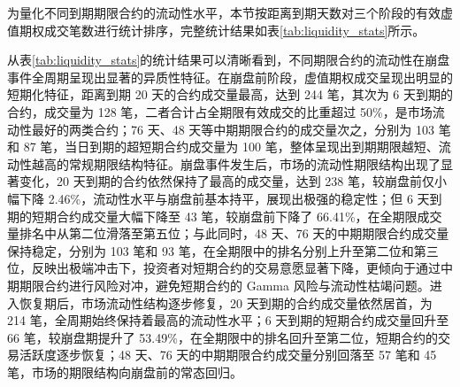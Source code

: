 为量化不同到期期限合约的流动性水平，本节按距离到期天数对三个阶段的有效虚值期权成交笔数进行统计排序，完整统计结果如表\ref{tab:liquidity_stats}所示。

\begin{table}[htbp]
  \centering
  \caption{崩盘事件全周期不同到期期限 OTM 期权成交笔数统计}\label{tab:liquidity_stats}
\end{table}
从表\ref{tab:liquidity_stats}的统计结果可以清晰看到，不同期限合约的流动性在崩盘事件全周期呈现出显著的异质性特征。在崩盘前阶段，虚值期权成交呈现出明显的短期化特征，距离到期 20 天的合约成交量最高，达到 244 笔，其次为 6 天到期的合约，成交量为 128 笔，二者合计占全期限有效成交的比重超过 50\%，是市场流动性最好的两类合约；76 天、48 天等中期期限合约的成交量次之，分别为 103 笔和 87 笔，当日到期的超短期合约成交量为 100 笔，整体呈现出到期期限越短、流动性越高的常规期限结构特征。崩盘事件发生后，市场的流动性期限结构出现了显著变化，20 天到期的合约依然保持了最高的成交量，达到 238 笔，较崩盘前仅小幅下降 2.46\%，流动性水平与崩盘前基本持平，展现出极强的稳定性；但 6 天到期的短期合约成交量大幅下降至 43 笔，较崩盘前下降了 66.41\%，在全期限成交量排名中从第二位滑落至第五位；与此同时，48 天、76 天的中期期限合约成交量保持稳定，分别为 103 笔和 93 笔，在全期限中的排名分别上升至第二位和第三位，反映出极端冲击下，投资者对短期合约的交易意愿显著下降，更倾向于通过中期期限合约进行风险对冲，避免短期合约的 Gamma 风险与流动性枯竭问题。进入恢复期后，市场流动性结构逐步修复，20 天到期的合约成交量依然居首，为 214 笔，全周期始终保持着最高的流动性水平；6 天到期的短期合约成交量回升至 66 笔，较崩盘期提升了 53.49\%，在全期限中的排名回升至第二位，短期合约的交易活跃度逐步恢复；48 天、76 天的中期期限合约成交量分别回落至 57 笔和 45 笔，市场的期限结构向崩盘前的常态回归。

